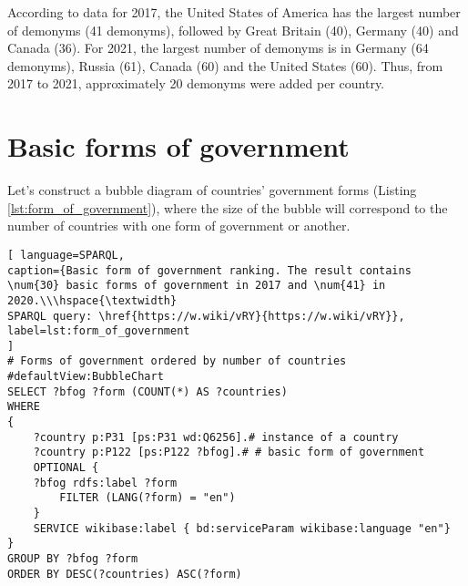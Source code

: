 
According to data for 2017, the United States of America has the largest number of demonyms (41 demonyms), followed by Great Britain (40), Germany (40) and Canada (36). For 2021, the largest number of demonyms is in Germany (64 demonyms), Russia (61), Canada (60) and the United States (60). Thus, from 2017 to 2021, approximately 20 demonyms were added per country.

\section{Basic forms of government}

Let's construct a bubble diagram of countries' government forms (Listing \ref{lst:form_of_government}), where the size of the bubble will correspond to the number of countries with one form of government or another.

\begin{lstlisting}[ language=SPARQL, 
caption={Basic form of government ranking. The result contains \num{30} basic forms of government in 2017 and \num{41} in 2020.\\\hspace{\textwidth}
SPARQL query: \href{https://w.wiki/vRY}{https://w.wiki/vRY}},
label=lst:form_of_government
]
# Forms of government ordered by number of countries
#defaultView:BubbleChart
SELECT ?bfog ?form (COUNT(*) AS ?countries)
WHERE 
{
	?country p:P31 [ps:P31 wd:Q6256].# instance of a country
	?country p:P122 [ps:P122 ?bfog].# # basic form of government
	OPTIONAL {
	?bfog rdfs:label ?form
		FILTER (LANG(?form) = "en")
	}
	SERVICE wikibase:label { bd:serviceParam wikibase:language "en"}
}
GROUP BY ?bfog ?form
ORDER BY DESC(?countries) ASC(?form)
\end{lstlisting}

